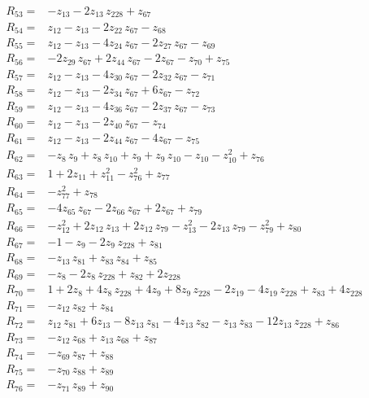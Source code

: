 \begin{align*}
R_{53}={}& -z_{13} - 2z_{13}\,z_{228} + z_{67} \\[2pt]
R_{54}={}& z_{12} - z_{13} - 2z_{22}\,z_{67} - z_{68} \\[2pt]
R_{55}={}& z_{12} - z_{13} - 4z_{24}\,z_{67} - 2z_{27}\,z_{67} - z_{69} \\[2pt]
R_{56}={}& -2z_{29}\,z_{67} + 2z_{44}\,z_{67} - 2z_{67} - z_{70} + z_{75} \\[2pt]
R_{57}={}& z_{12} - z_{13} - 4z_{30}\,z_{67} - 2z_{32}\,z_{67} - z_{71} \\[2pt]
R_{58}={}& z_{12} - z_{13} - 2z_{34}\,z_{67} + 6z_{67} - z_{72} \\[2pt]
R_{59}={}& z_{12} - z_{13} - 4z_{36}\,z_{67} - 2z_{37}\,z_{67} - z_{73} \\[2pt]
R_{60}={}& z_{12} - z_{13} - 2z_{40}\,z_{67} - z_{74} \\[2pt]
R_{61}={}& z_{12} - z_{13} - 2z_{44}\,z_{67} - 4z_{67} - z_{75} \\[2pt]
R_{62}={}& -z_{8}\,z_{9} + z_{8}\,z_{10} + z_{9} + z_{9}\,z_{10} - z_{10} - z_{10}^{2} + z_{76} \\[2pt]
R_{63}={}& 1 + 2z_{11} + z_{11}^{2} - z_{76}^{2} + z_{77} \\[2pt]
R_{64}={}& -z_{77}^{2} + z_{78} \\[2pt]
R_{65}={}& -4z_{65}\,z_{67} - 2z_{66}\,z_{67} + 2z_{67} + z_{79} \\[2pt]
R_{66}={}& -z_{12}^{2} + 2z_{12}\,z_{13} + 2z_{12}\,z_{79} - z_{13}^{2} - 2z_{13}\,z_{79} - z_{79}^{2} + z_{80} \\[2pt]
R_{67}={}& -1 - z_{9} - 2z_{9}\,z_{228} + z_{81} \\[2pt]
R_{68}={}& -z_{13}\,z_{81} + z_{83}\,z_{84} + z_{85} \\[2pt]
R_{69}={}& -z_{8} - 2z_{8}\,z_{228} + z_{82} + 2z_{228} \\[2pt]
R_{70}={}& 1 + 2z_{8} + 4z_{8}\,z_{228} + 4z_{9} + 8z_{9}\,z_{228} - 2z_{19} - 4z_{19}\,z_{228} + z_{83} + 4z_{228} \\[2pt]
R_{71}={}& -z_{12}\,z_{82} + z_{84} \\[2pt]
R_{72}={}& z_{12}\,z_{81} + 6z_{13} - 8z_{13}\,z_{81} - 4z_{13}\,z_{82} - z_{13}\,z_{83} - 12z_{13}\,z_{228} + z_{86} \\[2pt]
R_{73}={}& -z_{12}\,z_{68} + z_{13}\,z_{68} + z_{87} \\[2pt]
R_{74}={}& -z_{69}\,z_{87} + z_{88} \\[2pt]
R_{75}={}& -z_{70}\,z_{88} + z_{89} \\[2pt]
R_{76}={}& -z_{71}\,z_{89} + z_{90} \\[2pt]

\end{align*}
